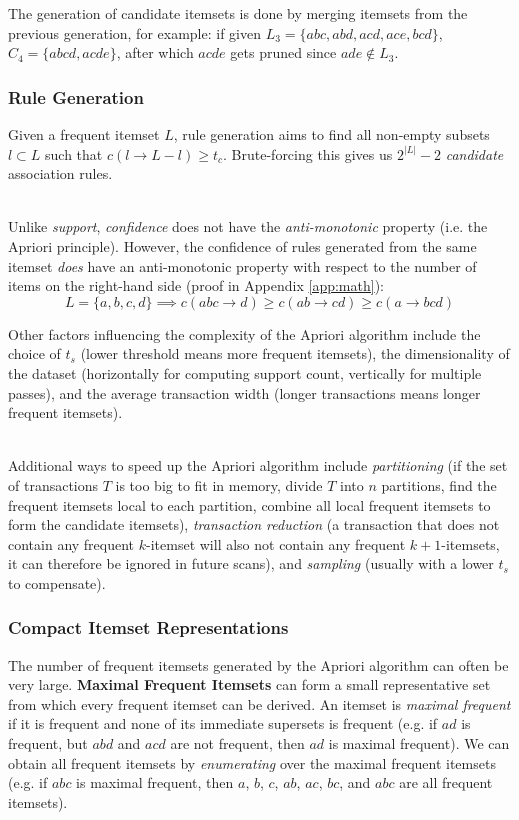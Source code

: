 \documentclass[12pt]{article}
\begin{document}
\noindent
The generation of candidate itemsets is done by merging itemsets from the previous generation, for example: if given $L_3 = \{ abc, abd, acd, ace, bcd \}$, $C_4 = \{ abcd, acde \}$, after which $acde$ gets pruned since $ade \notin L_3$.

\subsubsection{Rule Generation}
Given a frequent itemset $L$, rule generation aims to find all non-empty subsets $l \subset L$ such that $c(l \rightarrow L - l) \geq t_c$.
Brute-forcing this gives us $2^|L| - 2$ \textit{candidate} association rules.

\noindent
\\
Unlike \textit{support}, \textit{confidence} does not have the \textit{anti-monotonic} property (i.e. the Apriori principle).
However, the confidence of rules generated from the same itemset \textit{does} have an anti-monotonic property with respect to the number of items on the right-hand side (proof in Appendix \ref{app:math}):
\[ L = \{ a, b, c, d \} \implies c(abc \rightarrow d) \geq c(ab \rightarrow cd) \geq c(a \rightarrow bcd) \]

\noindent
Other factors influencing the complexity of the Apriori algorithm include the choice of $t_s$ (lower threshold means more frequent itemsets), the dimensionality of the dataset (horizontally for computing support count, vertically for multiple passes), and the average transaction width (longer transactions means longer frequent itemsets).

\noindent
\\
Additional ways to speed up the Apriori algorithm include \textit{partitioning} (if the set of transactions $T$ is too big to fit in memory, divide $T$ into $n$ partitions, find the frequent itemsets local to each partition, combine all local frequent itemsets to form the candidate itemsets), \textit{transaction reduction} (a transaction that does not contain any frequent $k$-itemset will also not contain any frequent $k+1$-itemsets, it can therefore be ignored in future scans), and \textit{sampling} (usually with a lower $t_s$ to compensate).

\subsubsection{Compact Itemset Representations}
The number of frequent itemsets generated by the Apriori algorithm can often be very large.
\textbf{Maximal Frequent Itemsets} can form a small representative set from which every frequent itemset can be derived.
An itemset is \textit{maximal frequent} if it is frequent and none of its immediate supersets is frequent (e.g. if $ad$ is frequent, but $abd$ and $acd$ are not frequent, then $ad$ is maximal frequent).
We can obtain all frequent itemsets by \textit{enumerating} over the maximal frequent itemsets (e.g. if $abc$ is maximal frequent, then $a$, $b$, $c$, $ab$, $ac$, $bc$, and $abc$ are all frequent itemsets).
\end{document}
